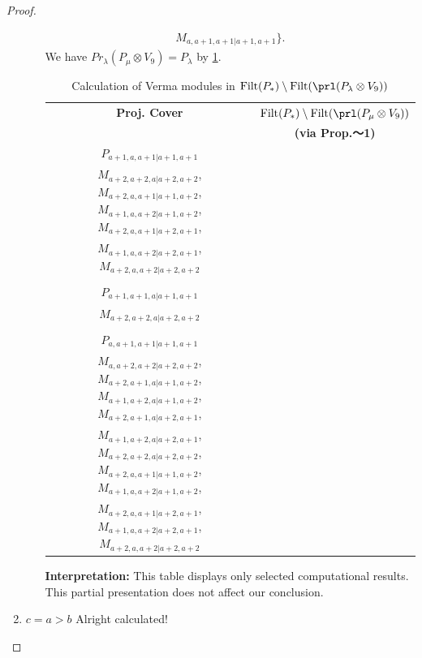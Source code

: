 \begin{proof}
\begin{enumerate}
\begin{enumerate}
\begin{equation}
\begin{aligned}
M_{a,a+1,a+1|a+1,a+1}
\}.
  \end{aligned}
\end{equation}
       We have $Pr_{\lambda}(P_\mu \otimes V_{9}) = P_\lambda  $ by \cref{tab:verma-analysis_b_14}.
\begin{table}[htbp]
\centering
\caption{Calculation of Verma modules in $\operatorname{Filt}(P_*) \setminus \operatorname{Filt}(\prl(P_\lambda \otimes V_{9})) $ } \label{tab:verma-analysis_b_14}
\begin{tabular}{cc}
\toprule
\textbf{Proj. Cover} & \textbf{$\operatorname{Filt}(P_*) \setminus \operatorname{Filt}(\prl(P_\mu \otimes V_{9})) $}  \\
     & \textbf{(via Prop.～1)}  \\
\midrule
 $P_{a+1,a,a+1|a+1,a+1}$ & \makecell{
 $M_{a+2,a+1,a|a+1,a+2}$,
 $M_{a+1,a+2,a|a+1,a+2}$,
 $M_{a+2,a+1,a|a+2,a+1}$,
 $M_{a+1,a+2,a|a+2,a+1}$, \\
 $M_{a+2,a+2,a|a+2,a+2}$,
 $M_{a+2,a,a+1|a+1,a+2}$,
 $M_{a+1,a,a+2|a+1,a+2}$,
 $M_{a+2,a,a+1|a+2,a+1}$, \\
 $M_{a+1,a,a+2|a+2,a+1}$,
 $M_{a+2,a,a+2|a+2,a+2}$
}\\
 & \\
 $P_{a+1,a+1,a|a+1,a+1}$ & \makecell{
 $M_{a+2,a+1,a|a+2,a+1}$,
 $M_{a+2,a+1,a|a+1,a+2}$,
 $M_{a+1,a+2,a|a+2,a+1}$,
 $M_{a+1,a+2,a|a+1,a+2}$, \\
 $M_{a+2,a+2,a|a+2,a+2}$
}\\
 & \\
 $P_{a,a+1,a+1|a+1,a+1}$ & \makecell{
 $M_{a,a+2,a+1|a+1,a+2}$,
 $M_{a,a+1,a+2|a+1,a+2}$,
 $M_{a,a+2,a+1|a+2,a+1}$,
 $M_{a,a+1,a+2|a+2,a+1}$, \\
 $M_{a,a+2,a+2|a+2,a+2}$,
 $M_{a+2,a+1,a|a+1,a+2}$,
 $M_{a+1,a+2,a|a+1,a+2}$,
 $M_{a+2,a+1,a|a+2,a+1}$, \\
 $M_{a+1,a+2,a|a+2,a+1}$,
 $M_{a+2,a+2,a|a+2,a+2}$,
 $M_{a+2,a,a+1|a+1,a+2}$,
 $M_{a+1,a,a+2|a+1,a+2}$, \\
 $M_{a+2,a,a+1|a+2,a+1}$,
 $M_{a+1,a,a+2|a+2,a+1}$,
 $M_{a+2,a,a+2|a+2,a+2}$
}\\
\bottomrule
\end{tabular}
\vspace{0.5em}
\parbox{\linewidth}{\small
\textbf{Interpretation:}
This table displays only selected computational results. This partial presentation does not affect our conclusion.
}
\end{table}
    \end{enumerate}
  \item $c=a>b$ Alright calculated!

\end{enumerate}
\end{proof}
